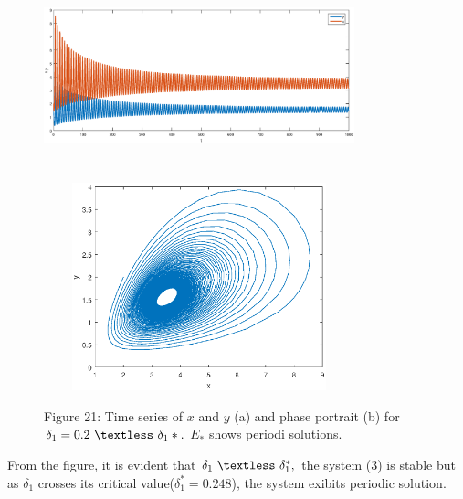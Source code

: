 \documentclass[a4paper, 10pt]{article}
\begin{document}
\begin{figure}[H]
	{\includegraphics[width=9cm, height=6cm]{27a.eps}}
	\endminipage\hfill
	{\includegraphics[width=9cm, height=6cm]{27b.eps}}
	\endminipage\hfill
	\begin{center} Figure 21: Time series of $x$ and $y$ (a) and phase portrait (b) for $\delta_1=0.2~\textless~\delta_1*.$ $E_*$ shows periodi solutions.  \end{center}
\end{figure}
From the figure, it is evident that $\delta_1~\textless~\delta_1^*,$ the system (3) is stable but as $\delta_1$ crosses its critical value($\delta_1^*=0.248$), the system exibits periodic solution.
\end{document}
